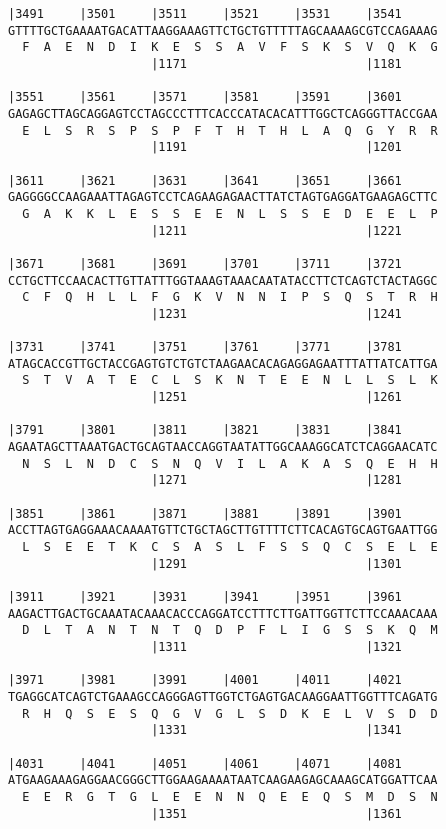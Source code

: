 \documentclass{article}
\begin{document}
\begin{Verbatim}
|3491     |3501     |3511     |3521     |3531     |3541     
GTTTTGCTGAAAATGACATTAAGGAAAGTTCTGCTGTTTTTAGCAAAAGCGTCCAGAAAG
  F  A  E  N  D  I  K  E  S  S  A  V  F  S  K  S  V  Q  K  G
                    |1171                         |1181     
  
|3551     |3561     |3571     |3581     |3591     |3601     
GAGAGCTTAGCAGGAGTCCTAGCCCTTTCACCCATACACATTTGGCTCAGGGTTACCGAA
  E  L  S  R  S  P  S  P  F  T  H  T  H  L  A  Q  G  Y  R  R
                    |1191                         |1201     
  
|3611     |3621     |3631     |3641     |3651     |3661     
GAGGGGCCAAGAAATTAGAGTCCTCAGAAGAGAACTTATCTAGTGAGGATGAAGAGCTTC
  G  A  K  K  L  E  S  S  E  E  N  L  S  S  E  D  E  E  L  P
                    |1211                         |1221     
  
|3671     |3681     |3691     |3701     |3711     |3721     
CCTGCTTCCAACACTTGTTATTTGGTAAAGTAAACAATATACCTTCTCAGTCTACTAGGC
  C  F  Q  H  L  L  F  G  K  V  N  N  I  P  S  Q  S  T  R  H
                    |1231                         |1241     
  
|3731     |3741     |3751     |3761     |3771     |3781     
ATAGCACCGTTGCTACCGAGTGTCTGTCTAAGAACACAGAGGAGAATTTATTATCATTGA
  S  T  V  A  T  E  C  L  S  K  N  T  E  E  N  L  L  S  L  K
                    |1251                         |1261     
  
|3791     |3801     |3811     |3821     |3831     |3841     
AGAATAGCTTAAATGACTGCAGTAACCAGGTAATATTGGCAAAGGCATCTCAGGAACATC
  N  S  L  N  D  C  S  N  Q  V  I  L  A  K  A  S  Q  E  H  H
                    |1271                         |1281     
  
|3851     |3861     |3871     |3881     |3891     |3901     
ACCTTAGTGAGGAAACAAAATGTTCTGCTAGCTTGTTTTCTTCACAGTGCAGTGAATTGG
  L  S  E  E  T  K  C  S  A  S  L  F  S  S  Q  C  S  E  L  E
                    |1291                         |1301     
  
|3911     |3921     |3931     |3941     |3951     |3961     
AAGACTTGACTGCAAATACAAACACCCAGGATCCTTTCTTGATTGGTTCTTCCAAACAAA
  D  L  T  A  N  T  N  T  Q  D  P  F  L  I  G  S  S  K  Q  M
                    |1311                         |1321     
  
|3971     |3981     |3991     |4001     |4011     |4021     
TGAGGCATCAGTCTGAAAGCCAGGGAGTTGGTCTGAGTGACAAGGAATTGGTTTCAGATG
  R  H  Q  S  E  S  Q  G  V  G  L  S  D  K  E  L  V  S  D  D
                    |1331                         |1341     
  
|4031     |4041     |4051     |4061     |4071     |4081     
ATGAAGAAAGAGGAACGGGCTTGGAAGAAAATAATCAAGAAGAGCAAAGCATGGATTCAA
  E  E  R  G  T  G  L  E  E  N  N  Q  E  E  Q  S  M  D  S  N
                    |1351                         |1361     
  

\end{Verbatim}
\end{document}
